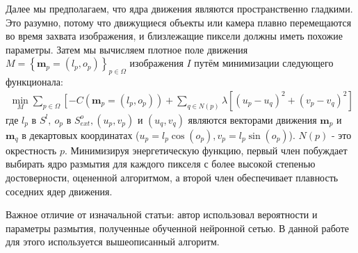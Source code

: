 Далее мы предполагаем, что ядра движения являются пространственно
гладкими. Это разумно, потому что движущиеся объекты или камера плавно перемещаются во время захвата изображения, и близлежащие пиксели должны иметь похожие параметры. Затем мы вычисляем плотное поле движения $M=\left\{\mathbf{m}_{p}=\left(l_{p}, o_{p}\right)\right\}_{p \in \Omega}$ изображения $I$ путём минимизации следующего функционала:
$$
\begin{gathered}
\min _{M} \sum_{p \in \Omega}\left[-C\left(\mathbf{m}_{p}=\left(l_{p}, o_{p}\right)\right)+\right. 
\sum_{q \in N(p)} \lambda\left[\left(u_{p}-u_{q}\right)^{2}+\left(v_{p}-v_{q}\right)^{2}\right]
\end{gathered}
$$
где $l_{p}$ в  $S^{l},\ o_{p}$ в $S_{e x t}^{o},\left(u_{p}, v_{p}\right)$ и $\left(u_{q}, v_{q}\right)$ являются векторами движения $\mathbf{m}_{p}$ и $\mathbf{m}_{q}$ в декартовых координатах ($u_{p}=l_{p} \cos \left(o_{p}\right), v_{p}=l_{p} \sin \left(o_{p}\right)$). $N(p)$ - это окрестность $p$. Минимизируя энергетическую функцию, первый член побуждает выбирать ядро размытия для каждого пикселя с более высокой степенью достоверности, оцененной алгоритмом, а второй член обеспечивает плавность соседних ядер движения.

Важное отличие от изначальной статьи: автор использовал вероятности и параметры размытия, полученные обученной нейронной сетью. В данной работе для этого используется вышеописанный алгоритм.

